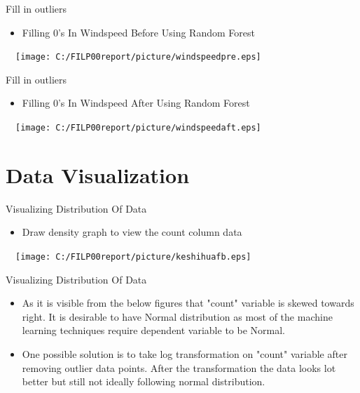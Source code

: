 \documentclass[
 size=14pt,
 paper=smartboard,  %
 mode=present, 		%
 display=slides, 	%
 style=tuliplab,  	%
 pauseslide,
 fleqn,leqno]{powerdot}
\begin{document}

\begin{slide}[toc=,bm=]{Fill in outliers}
\begin{itemize}
\item
Filling 0's In Windspeed Before Using Random Forest
\end{itemize}
\begin{center}
  \texttt{[image: C:/FILP00report/picture/windspeedpre.eps]}
\end{center}
\end{slide}
\begin{slide}[toc=,bm=]{Fill in outliers}
\begin{itemize}
\item
Filling 0's In Windspeed After Using Random Forest
\end{itemize}
\begin{center}
  \texttt{[image: C:/FILP00report/picture/windspeedaft.eps]}
\end{center}
\end{slide}

\section{Data Visualization}


\begin{slide}[toc=,bm=]{Visualizing Distribution Of Data}
\begin{itemize}
\item
Draw density graph to view the count column data
\end{itemize}
\begin{center}
  \texttt{[image: C:/FILP00report/picture/keshihuafb.eps]}
\end{center}
\end{slide}


\begin{slide}{Visualizing Distribution Of Data}
\begin{itemize}
\item
As it is visible from the below figures that "count" variable is skewed towards right. It is desirable to have Normal distribution as most of the machine learning techniques require dependent variable to be Normal.
\item
 One possible solution is to take log transformation on "count" variable after removing outlier data points. After the transformation the data looks lot better but still not ideally following normal distribution.
\end{itemize}
\end{slide}
\end{document}
